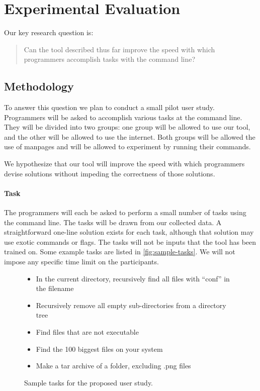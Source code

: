 \section{Experimental Evaluation}

Our key research question is:
%
\begin{quote}
    Can the tool described thus far improve the speed with which programmers
    accomplish tasks with the command line?
\end{quote}

\subsection{Methodology}

To answer this question we plan to conduct a small pilot user study. Programmers
will be asked to accomplish various tasks at the command line. They will be
divided into two groups: one group will be allowed to use our tool, and the
other will be allowed to use the internet. Both groups will be allowed the use
of manpages and will be allowed to experiment by running their commands.

We hypothesize that our tool will improve the speed with which programmers
devise solutions without impeding the correctness of those solutions.

\paragraph{Task} The programmers will each be asked to perform a small number of
tasks using the command line. The tasks will be drawn from our collected data.
A straightforward one-line solution exists for each task, although that solution
may use exotic commands or flags. The tasks will not be inputs that the tool has
been trained on. Some example tasks are listed in \autoref{fig:sample-tasks}. We
will not impose any specific time limit on the participants.

\begin{figure}[ht]
    \begin{framed}
    \begin{itemize}\itemsep-1pt
        \item In the current directory, recursively find all files with ``conf''
            in the filename
        \item Recursively remove all empty sub-directories from a directory tree
        \item Find files that are not executable
        \item Find the 100 biggest files on your system
        \item Make a tar archive of a folder, excluding .png files
    \end{itemize}
    \end{framed}
    \caption{Sample tasks for the proposed user study.}
    \vspace{-10pt}
    \label{fig:sample-tasks}
\end{figure}

